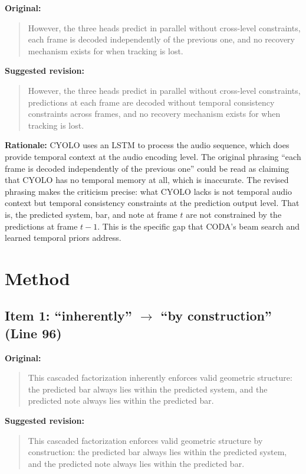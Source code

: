 \documentclass{article}
\begin{document}
\textbf{Original:}
\begin{quote}
However, the three heads predict in parallel without cross-level constraints, each frame is decoded independently of the previous one, and no recovery mechanism exists for when tracking is lost.
\end{quote}

\textbf{Suggested revision:}
\begin{quote}
However, the three heads predict in parallel without cross-level constraints, predictions at each frame are decoded without temporal consistency constraints across frames, and no recovery mechanism exists for when tracking is lost.
\end{quote}

\textbf{Rationale:}
CYOLO uses an LSTM to process the audio sequence, which does provide temporal context at the audio encoding level. The original phrasing ``each frame is decoded independently of the previous one'' could be read as claiming that CYOLO has no temporal memory at all, which is inaccurate. The revised phrasing makes the criticism precise: what CYOLO lacks is not temporal audio context but temporal consistency constraints at the prediction output level. That is, the predicted system, bar, and note at frame $t$ are not constrained by the predictions at frame $t{-}1$. This is the specific gap that CODA's beam search and learned temporal priors address.

\section*{Method}

\subsection*{Item 1: ``inherently'' $\to$ ``by construction'' (Line 96)}

\textbf{Original:}
\begin{quote}
This cascaded factorization inherently enforces valid geometric structure: the predicted bar always lies within the predicted system, and the predicted note always lies within the predicted bar.
\end{quote}

\textbf{Suggested revision:}
\begin{quote}
This cascaded factorization enforces valid geometric structure by construction: the predicted bar always lies within the predicted system, and the predicted note always lies within the predicted bar.
\end{quote}
\end{document}
